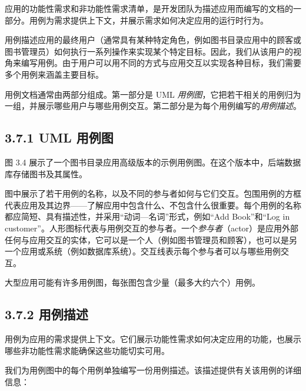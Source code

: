 应用的功能性需求和非功能性需求清单，是开发团队为描述应用而编写的文档的一部分。用例为需求提供上下文，并展示需求如何决定应用的运行时行为。

用例描述应用的最终用户（通常具有某种特定角色，例如图书目录应用中的顾客或图书管理员）如何执行一系列操作来实现某个特定目标。因此，我们从该用户的视角来编写用例。由于用户可以用不同的方式与应用交互以实现各种目标，我们需要多个用例来涵盖主要目标。

用例文档通常由两部分组成。第一部分是 UML \emph{用例图}，它把若干相关的用例归为一组，并展示哪些用户与哪些用例交互。第二部分是为每个用例编写的\emph{用例描述}。

\subsection{3.7.1 UML 用例图}

图 3.4 展示了一个图书目录应用高级版本的示例用例图。在这个版本中，后端数据库存储图书及其属性。


图中展示了若干用例的名称，以及不同的参与者如何与它们交互。包围用例的方框代表应用及其边界——了解应用中包含什么、不包含什么很重要。每个用例的名称都应简短、具有描述性，并采用“动词—名词”形式，例如“Add Book”和“Log in customer”。人形图标代表与用例交互的参与者。一个\emph{参与者}（actor）是应用外部任何与应用交互的实体，它可以是一个人（例如图书管理员和顾客），也可以是另一个应用或系统（例如数据库系统）。交互线表示每个参与者可以与哪些用例交互。


大型应用可能有许多用例图，每张图包含少量（最多大约六个）用例。

\subsection{3.7.2 用例描述}

用例为应用的需求提供上下文。它们展示功能性需求如何决定应用的功能，也展示哪些非功能性需求能确保这些功能切实可用。

我们为用例图中的每个用例单独编写一份用例描述。该描述提供有关该用例的详细信息：

